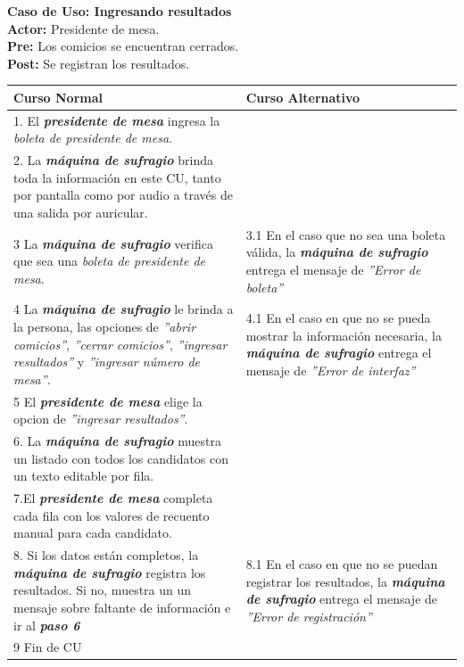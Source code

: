 \documentclass[spanish, 10pt,a4paper]{article}
\numberwithin{equation}{section} %
\begin{document}
\newpage
\noindent\textbf{Caso de Uso: Ingresando resultados}\\
\textbf{Actor: } Presidente de mesa.\\
\textbf{Pre: } Los comicios se encuentran cerrados.\\
\textbf{Post: } Se registran los resultados.\\
\begin{table}[H]
  \centering
\bgroup
\def\arraystretch{1.3}
  \begin{tabular}{p{9cm} | p{7cm}}
    \hline
    Curso Normal & Curso Alternativo \\
    \hline
    \hline    
    1. El \textbf{\textit{presidente de mesa}} ingresa la \textit{boleta de presidente de mesa}. 
    & \\
    
    \hline
    2. La \textbf{\textit{máquina de sufragio}} brinda toda la información en este CU, tanto por pantalla como por audio a través de una salida por auricular.
    &
    \\
    
    \hline
    3 La \textbf{\textit{máquina de sufragio}} verifica que sea una \textit{boleta de presidente de mesa}.
    & 
    3.1 En el caso que no sea una boleta válida, la \textbf{\textit{máquina de sufragio}} entrega el mensaje de \textit{''Error de boleta''}
    \\
    
    \hline
    4 La \textbf{\textit{máquina de sufragio}} le brinda a la persona, las opciones de \textit{''abrir comicios''}, \textit{''cerrar comicios''}, \textit{''ingresar resultados''} y \textit{''ingresar número de mesa''}.
    & 
    4.1 En el caso en que no se pueda mostrar la información necesaria, la \textbf{\textit{máquina de sufragio}} entrega el mensaje de \textit{''Error de interfaz''}
    \\
    
    \hline
    5 El \textbf{\textit{presidente de mesa}} elige la opcion de \textit{''ingresar resultados''}.
    & \\
    
    \hline
    6. La \textbf{\textit{máquina de sufragio}} muestra un listado con todos los candidatos con un texto editable por fila.
    \\
    
  \hline
    7.El \textbf{\textit{presidente de mesa}} completa cada fila con los valores de recuento manual para cada candidato.
    \\
	
    \hline
    8. Si los datos están completos, la \textbf{\textit{máquina de sufragio}} registra los resultados. Si no, muestra un un mensaje sobre faltante de información e ir al \textbf{\textit{paso 6}}
    &
    8.1 En el caso en que no se puedan registrar los resultados, la \textbf{\textit{máquina de sufragio}} entrega el mensaje de \textit{''Error de registración''}
    \\
    
    \hline
    9 Fin de CU
    & \\
    \hline
  \end{tabular}
\egroup
\end{table}
\end{document}
